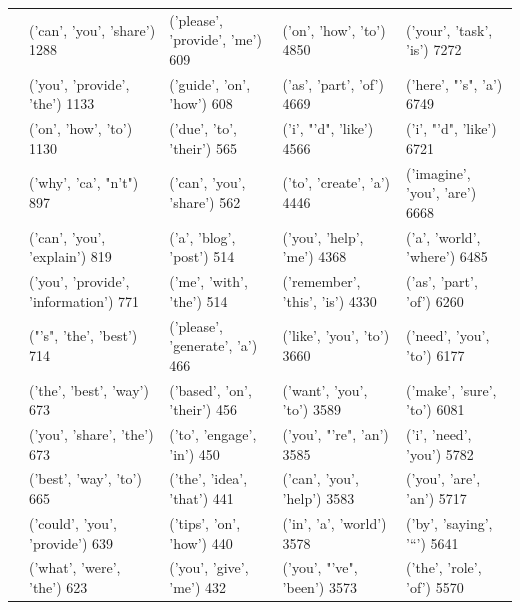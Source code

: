 \begin{table}[t]
\begin{tabular}{|l|l|l|l|l|}
                                  & ('can', 'you', 'share') 1288          & ('please', 'provide', 'me') 609   & ('on', 'how', 'to') 4850        & ('your', 'task', 'is') 7272      \\
                                  & ('you', 'provide', 'the') 1133        & ('guide', 'on', 'how') 608        & ('as', 'part', 'of') 4669       & ('here', "'s", 'a') 6749         \\
                                  & ('on', 'how', 'to') 1130              & ('due', 'to', 'their') 565        & ('i', "'d", 'like') 4566        & ('i', "'d", 'like') 6721         \\
                                  & ('why', 'ca', "n't") 897              & ('can', 'you', 'share') 562       & ('to', 'create', 'a') 4446      & ('imagine', 'you', 'are') 6668   \\
                                  & ('can', 'you', 'explain') 819         & ('a', 'blog', 'post') 514         & ('you', 'help', 'me') 4368      & ('a', 'world', 'where') 6485     \\
                                  & ('you', 'provide', 'information') 771 & ('me', 'with', 'the') 514         & ('remember', 'this', 'is') 4330 & ('as', 'part', 'of') 6260        \\
                                  & ("'s", 'the', 'best') 714             & ('please', 'generate', 'a') 466   & ('like', 'you', 'to') 3660      & ('need', 'you', 'to') 6177       \\
                                  & ('the', 'best', 'way') 673            & ('based', 'on', 'their') 456      & ('want', 'you', 'to') 3589      & ('make', 'sure', 'to') 6081      \\
                                  & ('you', 'share', 'the') 673           & ('to', 'engage', 'in') 450        & ('you', "'re", 'an') 3585       & ('i', 'need', 'you') 5782        \\
                                  & ('best', 'way', 'to') 665             & ('the', 'idea', 'that') 441       & ('can', 'you', 'help') 3583     & ('you', 'are', 'an') 5717        \\
                                  & ('could', 'you', 'provide') 639       & ('tips', 'on', 'how') 440         & ('in', 'a', 'world') 3578       & ('by', 'saying', '``') 5641      \\
                                  & ('what', 'were', 'the') 623           & ('you', 'give', 'me') 432         & ('you', "'ve", 'been') 3573     & ('the', 'role', 'of') 5570       \\

\end{tabular}
\end{table}
